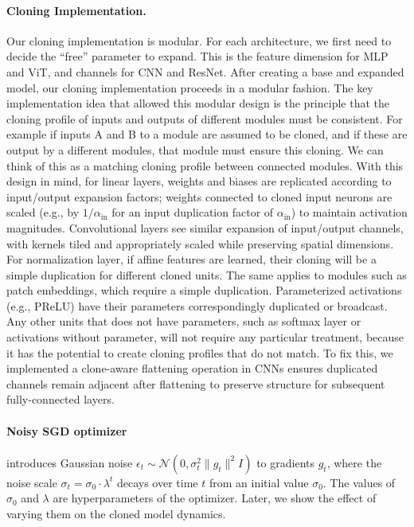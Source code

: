 \documentclass{article}
\numberwithin{figure}{section}
\begin{document}
\paragraph{Cloning Implementation.}  Our cloning implementation is modular. For each architecture, we first need to decide the ``free'' parameter to expand. This is the feature dimension for MLP and ViT, and channels for CNN and ResNet. After creating a base and expanded model, our cloning implementation proceeds in a modular fashion. The key implementation idea that allowed this modular design is the principle that the cloning profile of inputs and outputs of different modules must be consistent. For example if inputs A and B to a module are assumed to be cloned, and if these are output by a different modules, that module must ensure this cloning. We can think of this as a matching cloning profile between connected modules. With this design in mind, for linear layers, weights and biases are replicated according to input/output expansion factors; weights connected to cloned input neurons are scaled (e.g., by $1/\alpha_{\text{in}}$ for an input duplication factor of $\alpha_{\text{in}}$) to maintain activation magnitudes. Convolutional layers see similar expansion of input/output channels, with kernels tiled and appropriately scaled while preserving spatial dimensions. For normalization layer, if affine features are learned, their cloning will be a simple duplication for different cloned units. The same applies to modules such as patch embeddings, which require a simple duplication.  Parameterized activations (e.g., PReLU) have their parameters correspondingly duplicated or broadcast. Any other units that does not have parameters, such as softmax layer or activations without parameter, will not require any particular treatment, because it has the potential to create cloning profiles that do not match. 
To fix this, we implemented a clone-aware flattening operation in CNNs ensures duplicated channels remain adjacent after flattening to preserve structure for subsequent fully-connected layers.
\paragraph{Noisy SGD optimizer} introduces Gaussian noise $\epsilon_t \sim \mathcal{N}(0, \sigma_t^2 \|g_t\|^2 I)$ to gradients $g_t$, where the noise scale $\sigma_t = \sigma_0 \cdot \lambda^t$ decays over time $t$ from an initial value $\sigma_0$. The values of $\sigma_0$ and $\lambda$ are hyperparameters of the optimizer. Later, we show the effect of varying them on the cloned model dynamics.
 
\end{document}
